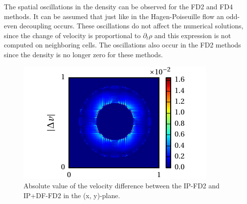 The spatial oscillations in the density can be observed for the FD2 and FD4 methods.
It can be assumed that just like in the Hagen-Poiseuille flow  an odd-even decoupling occurs.
These oscillations do not affect the numerical solutions, since
the change of velocity is proportional to $\partial_t \rho$ and this expression is not computed on neighboring cells.
The oscillations also occur in the FD2 methods since the density is no longer zero for these methods.%

\begin{figure}[!bp]
  \begin{minipage}[c]{0.4\textwidth}
      \centering
      \includegraphics{gfx/immersed_boundary/tcflow/discussion/vzdiff.pdf}
  \end{minipage}
  \begin{minipage}[c]{0.6\textwidth}
      \caption{Absolute value of the velocity difference between the IP-FD2 and IP+DF-FD2 in the (x, y)-plane.
      \label{valid:hpflow_velodiff_discussion}
      }
  \end{minipage}
\end{figure}

